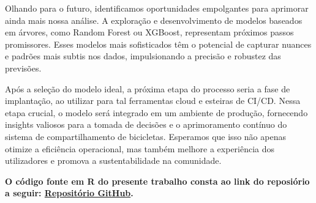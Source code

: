 \documentclass[
  letterpaper,
  DIV=11,
  numbers=noendperiod]{scrartcl}
\begin{document}
Olhando para o futuro, identificamos oportunidades empolgantes para
aprimorar ainda mais nossa análise. A exploração e desenvolvimento de
modelos baseados em árvores, como Random Forest ou XGBoost, representam
próximos passos promissores. Esses modelos mais sofisticados têm o
potencial de capturar nuances e padrões mais subtis nos dados,
impulsionando a precisão e robustez das previsões.

Após a seleção do modelo ideal, a próxima etapa do processo seria a fase
de implantação, ao utilizar para tal ferramentas cloud e esteiras de
CI/CD. Nessa etapa crucial, o modelo será integrado em um ambiente de
produção, fornecendo insights valiosos para a tomada de decisões e o
aprimoramento contínuo do sistema de compartilhamento de bicicletas.
Esperamos que isso não apenas otimize a eficiência operacional, mas
também melhore a experiência dos utilizadores e promova a
sustentabilidade na comunidade.

\textbf{O código fonte em R do presente trabalho consta ao link do
reposiório a seguir:
\href{https://github.com/mello-pedro/SUPERV_ML_MCDE_23_24/blob/main/R_SOURCE_CODE_BIKE_SHARING.qmd}{Repositório
GitHub}.}
\end{document}
